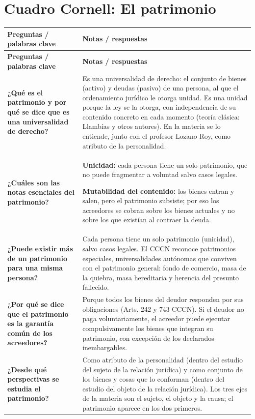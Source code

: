 \documentclass[12pt,oneside]{book}
\newcommand{\cornellinicio}{\begingroup\small\renewcommand{\arraystretch}{1.4}}
\newcommand{\cornellpregunta}[2]{\textbf{#1} & #2 \\ \hline}
\begin{document}
\section{Cuadro Cornell: El patrimonio}

\cornellinicio
\begin{longtable}{|Q|Z|}
\hline
{}\textbf{Preguntas / palabras clave} & \textbf{Notas / respuestas} \\ \hline
\endfirsthead
\hline
{}\textbf{Preguntas / palabras clave} & \textbf{Notas / respuestas} \\ \hline
\endhead

\cornellpregunta{¿Qué es el patrimonio y por qué se dice que es una universalidad de derecho?}{%
Es una universalidad de derecho: el conjunto de bienes (activo) y deudas (pasivo) de una persona, al que el ordenamiento jurídico le otorga unidad. Es una unidad porque la ley se la otorga, con independencia de su contenido concreto en cada momento (teoría clásica: Llambías y otros autores). En la materia se lo entiende, junto con el profesor Lozano Roy, como atributo de la personalidad.}

\cornellpregunta{¿Cuáles son las notas esenciales del patrimonio?}{%
\textbf{Unicidad:} cada persona tiene un solo patrimonio, que no puede fragmentar a voluntad salvo casos legales.

\textbf{Mutabilidad del contenido:} los bienes entran y salen, pero el patrimonio subsiste; por eso los acreedores se cobran sobre los bienes actuales y no sobre los que existían al contraer la deuda.}

\cornellpregunta{¿Puede existir más de un patrimonio para una misma persona?}{%
Cada persona tiene un solo patrimonio (unicidad), salvo casos legales. El CCCN reconoce patrimonios especiales, universalidades autónomas que conviven con el patrimonio general: fondo de comercio, masa de la quiebra, masa hereditaria y herencia del presunto fallecido.}

\cornellpregunta{¿Por qué se dice que el patrimonio es la garantía común de los acreedores?}{%
Porque todos los bienes del deudor responden por sus obligaciones (Arts. 242 y 743 CCCN). Si el deudor no paga voluntariamente, el acreedor puede ejecutar compulsivamente los bienes que integran su patrimonio, con excepción de los declarados inembargables.}

\cornellpregunta{¿Desde qué perspectivas se estudia el patrimonio?}{%
Como atributo de la personalidad (dentro del estudio del sujeto de la relación jurídica) y como conjunto de los bienes y cosas que lo conforman (dentro del estudio del objeto de la relación jurídica). Los tres ejes de la materia son el sujeto, el objeto y la causa; el patrimonio aparece en los dos primeros.}


\end{longtable}
\end{document}

